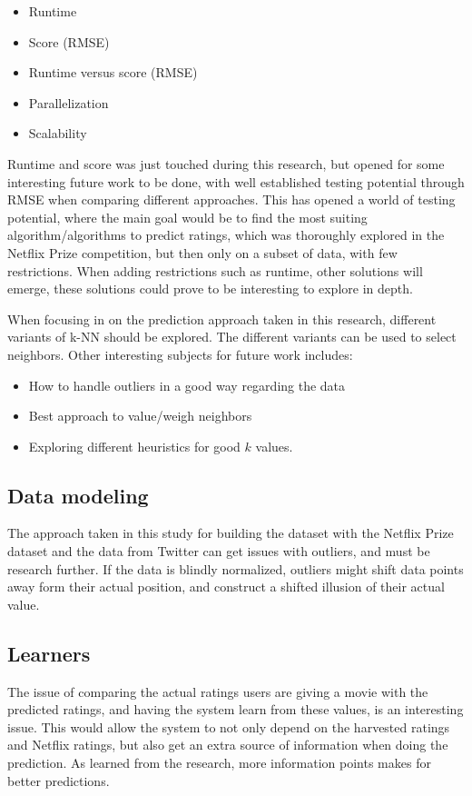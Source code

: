 \begin{itemize}
    \item Runtime
    \item Score (RMSE)
    \item Runtime versus score (RMSE)
    \item Parallelization
    \item Scalability
\end{itemize}

Runtime and score was just touched during this research, but opened for some interesting future work to be done, with well established testing potential through RMSE when comparing different approaches. This has opened a world of testing potential, where the main goal would be to find the most suiting algorithm/algorithms to predict ratings, which was thoroughly explored in the Netflix Prize competition, but then only on a subset of data, with few restrictions. When adding restrictions such as runtime, other solutions will emerge, these solutions could prove to be interesting to explore in depth.

When focusing in on the prediction approach taken in this research, different variants of k-NN should be explored. The different variants can be used to select neighbors. Other interesting subjects for future work includes:

\begin{itemize}
    \item How to handle outliers in a good way regarding the data
    \item Best approach to value/weigh neighbors
    \item Exploring different heuristics for good $k$ values.
\end{itemize}



\subsection{Data modeling}
The approach taken in this study for building the dataset with the Netflix Prize dataset and the data from Twitter can get issues with outliers, and must be research further. If the data is blindly normalized, outliers might shift data points away form their actual position, and construct a shifted illusion of their actual value.


\subsection{Learners}
The issue of comparing the actual ratings users are giving a movie with the predicted ratings, and having the system learn from these values, is an interesting issue. This would allow the system to not only depend on the harvested ratings and Netflix ratings, but also get an extra source of information when doing the prediction. As learned from the research, more information points makes for better predictions.

